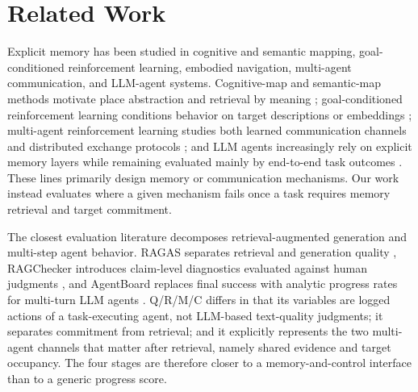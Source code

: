 \documentclass[letterpaper]{article} %
\begin{document}
\section{Related Work}

Explicit memory has been studied in cognitive and semantic mapping, goal-conditioned reinforcement learning, embodied navigation, multi-agent communication, and LLM-agent systems. Cognitive-map and semantic-map methods motivate place abstraction and retrieval by meaning \citep{tolman1948cognitive,gupta2017cognitive,savinov2018semi}; goal-conditioned reinforcement learning conditions behavior on target descriptions or embeddings \citep{andrychowicz2017hindsight}; multi-agent reinforcement learning studies both learned communication channels \citep{sukhbaatar2016commnet,foerster2018ctde} and distributed exchange protocols \citep{boyd2006gossip}; and LLM agents increasingly rely on explicit memory layers while remaining evaluated mainly by end-to-end task outcomes \citep{wang2023voyager,shinn2023reflexion,packer2023memgpt,park2023generative,wu2023autogen}. These lines primarily design memory or communication mechanisms. Our work instead evaluates where a given mechanism fails once a task requires memory retrieval and target commitment.

The closest evaluation literature decomposes retrieval-augmented generation and multi-step agent behavior. RAGAS separates retrieval and generation quality \citep{es2024ragas}, RAGChecker introduces claim-level diagnostics evaluated against human judgments \citep{ru2024ragchecker}, and AgentBoard replaces final success with analytic progress rates for multi-turn LLM agents \citep{ma2024agentboard}. Q/R/M/C differs in that its variables are logged actions of a task-executing agent, not LLM-based text-quality judgments; it separates commitment from retrieval; and it explicitly represents the two multi-agent channels that matter after retrieval, namely shared evidence and target occupancy. The four stages are therefore closer to a memory-and-control interface than to a generic progress score.
\end{document}
